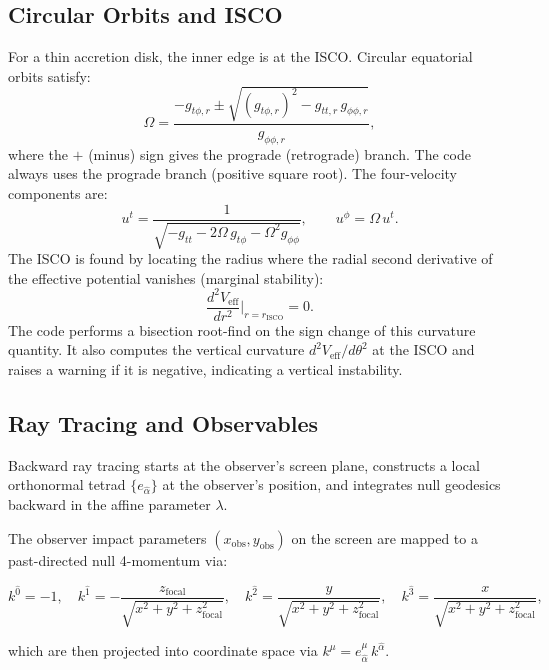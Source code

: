 \documentclass[11pt,twoside]{article}
\begin{document}
\subsection{Circular Orbits and ISCO}
For a thin accretion disk, the inner edge is at the ISCO. Circular equatorial
orbits satisfy:
\begin{equation}
\Omega = \frac{-g_{t\phi,r} \pm \sqrt{(g_{t\phi,r})^2 - g_{tt,r}\,g_{\phi\phi,r}}}{g_{\phi\phi,r}},
\end{equation}
where the $+$ (minus) sign gives the prograde (retrograde) branch. The code
always uses the prograde branch (positive square root). The four-velocity
components are:
\begin{equation}
u^t = \frac{1}{\sqrt{-g_{tt} - 2\Omega\,g_{t\phi} - \Omega^2 g_{\phi\phi}}}, \qquad
u^\phi = \Omega\,u^t.
\end{equation}
The ISCO is found by locating the radius where the radial second derivative of
the effective potential vanishes (marginal stability):
\begin{equation}
\frac{d^2 V_{\text{eff}}}{dr^2}\bigg|_{r = r_{\text{ISCO}}} = 0.
\end{equation}
The code performs a bisection root-find on the sign change of this curvature
quantity. It also computes the vertical curvature $d^2 V_{\text{eff}}/d\theta^2$
at the ISCO and raises a warning if it is negative, indicating a vertical
instability.

\subsection{Ray Tracing and Observables}
Backward ray tracing starts at the observer's screen plane, constructs a local
orthonormal tetrad $\{e_{\hat{\alpha}}\}$ at the observer's position, and
integrates null geodesics backward in the affine parameter $\lambda$.

The observer impact parameters $(x_{\text{obs}}, y_{\text{obs}})$ on the screen
are mapped to a past-directed null 4-momentum via:

\begin{equation}
k^{\hat{0}} = -1,\quad k^{\hat{1}} = -\frac{z_{\text{focal}}}{\sqrt{x^2 + y^2 + z_{\text{focal}}^2}},\quad k^{\hat{2}} = \frac{y}{\sqrt{x^2 + y^2 + z_{\text{focal}}^2}},\quad k^{\hat{3}} = \frac{x}{\sqrt{x^2 + y^2 + z_{\text{focal}}^2}},
\end{equation}

which are then projected into coordinate space via $k^\mu = e^\mu_{\hat{\alpha}}\,k^{\hat{\alpha}}$.
\end{document}
